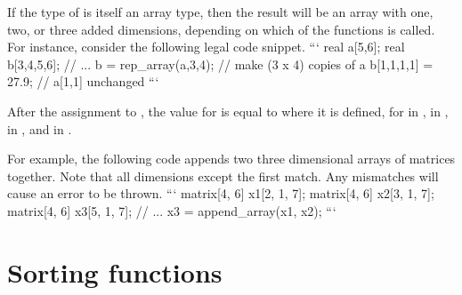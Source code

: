 \begin{description}
\begin{description}
\begin{description}
\begin{description}
\begin{description}
\begin{description}
\begin{description}
\begin{description}
\begin{description}
\begin{description}
\begin{description}
\begin{description}
\begin{description}
\begin{description}
\begin{description}
\begin{description}
\begin{description}
\begin{description}
\begin{description}
\begin{description}
\begin{description}
\begin{description}
\begin{description}
\begin{description}
\begin{description}
\begin{description}
\begin{description}
\begin{description}
\begin{description}
\begin{description}
\begin{description}
If the type  of  is itself an array type, then the result will be an array with one, two, or three added dimensions, depending on which of the  functions is called.  For instance, consider the following legal code snippet.
```
real a[5,6];
real b[3,4,5,6];
// ... 
b = rep_array(a,3,4); //  make (3 x 4) copies of a
b[1,1,1,1] = 27.9;    //  a[1,1] unchanged 
```

After the assignment to , the value for  is equal to  where it is defined, for  in ,  in ,  in , and  in . %

\begin{description}  \end{description}

For example, the following code appends two three dimensional arrays of matrices together. Note that all dimensions except the first match. Any mismatches will cause an error to be thrown.
```
matrix[4, 6] x1[2, 1, 7];
matrix[4, 6] x2[3, 1, 7];
matrix[4, 6] x3[5, 1, 7];
// ... 
x3 = append_array(x1, x2); 
```


\section{Sorting functions}


\end{description}
\end{description}
\end{description}
\end{description}
\end{description}
\end{description}
\end{description}
\end{description}
\end{description}
\end{description}
\end{description}
\end{description}
\end{description}
\end{description}
\end{description}
\end{description}
\end{description}
\end{description}
\end{description}
\end{description}
\end{description}
\end{description}
\end{description}
\end{description}
\end{description}
\end{description}
\end{description}
\end{description}
\end{description}
\end{description}
\end{description}
